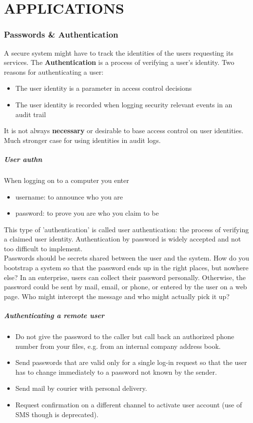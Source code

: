 \documentclass[a4paper, 10pt, titlepage]{article}
\begin{document}
\newpage
\thispagestyle{empty}
\part{APPLICATIONS}

\newpage
\section{Passwords \& Authentication}
A secure system might have to track the identities of the users requesting its services. The \textbf{Authentication} is a process of verifying a user’s identity.
Two reasons for authenticating a user:
\begin{itemize}
\item The user identity is a parameter in access control decisions
\item The user identity is recorded when logging security relevant events in an audit trail
\end{itemize}
It is not always \textbf{necessary} or desirable to base access control on user identities. Much stronger case for using identities in audit logs.

\subsubsection*{User authn}
When logging on to a computer you enter
\begin{itemize}
\item username: to announce who you are
\item password: to prove you are who you claim to be
\end{itemize}
This type of 'authentication' is called user authentication: the process of verifying a claimed user identity. Authentication by password is widely accepted and not too difficult to implement. \medskip \\
Passwords should be secrets shared between the user and the system. How do you bootstrap a system so that the password ends up in the
right places, but nowhere else? In an enterprise, users can collect their password personally. Otherwise, the password could be sent by mail, email, or phone, or entered by the user on a web page. Who might intercept the message and who might actually pick it up?

\subsubsection*{Authenticating a remote user}
\begin{itemize}
\item Do not give the password to the caller but call back an authorized phone number from your files, e.g. from an internal company address book. 
\item Send passwords that are valid only for a single log-in request so that the user has to change immediately to a password not known by the sender.
\item Send mail by courier with personal delivery.
\item Request confirmation on a different channel to activate user account (use of SMS though is deprecated).
\end{itemize}
\end{document}
